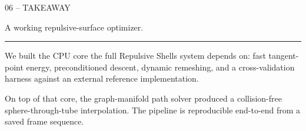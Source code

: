 \documentclass[aspectratio=169,14pt]{beamer}
\newcommand{\decklabel}[1]{%
  {\fontsize{8.5}{11}\selectfont\color{Label}\MakeUppercase{#1}\par}%
}
\newcommand{\slidetitle}[1]{%
  {\fontsize{25}{30}\selectfont\color{Text}\raggedright #1\par}%
}
\newcommand{\slidebody}[1]{%
  {\fontsize{12.2}{15.4}\selectfont\color{Dim}\raggedright #1\par}%
}
\newcommand{\thinrule}{%
  \par\vspace{0.24cm}%
  {\color{Rule}\rule{2.45cm}{0.35pt}}%
  \par\vspace{0.25cm}%
}
\begin{document}
\begin{frame}[plain]
  \vspace*{0.82cm}
  \hspace*{1.22cm}
  \begin{minipage}{0.78\paperwidth}
  \raggedright
  \decklabel{06 -- Takeaway}
  \vspace{0.54cm}
  \slidetitle{A working repulsive-surface optimizer.}
  \thinrule
  \slidebody{We built the CPU core the full Repulsive Shells system depends on: fast tangent-point energy, preconditioned descent, dynamic remeshing, and a cross-validation harness against an external reference implementation.}
  \vspace{0.30cm}
  \slidebody{On top of that core, the graph-manifold path solver produced a collision-free sphere-through-tube interpolation. The pipeline is reproducible end-to-end from a saved frame sequence.}
  \end{minipage}
\end{frame}
\end{document}
